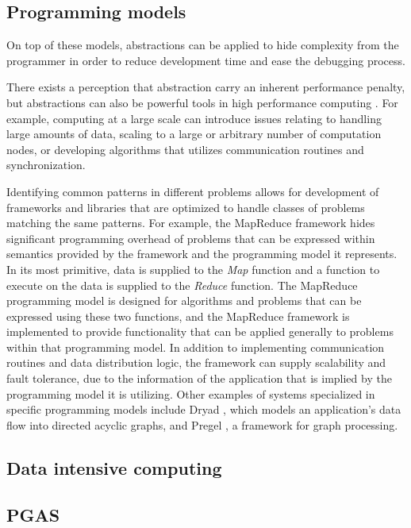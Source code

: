 \documentclass{uit-report}
\begin{document}
\subsection{Programming models}
On top of these models, abstractions can be applied to hide complexity from the programmer in order to reduce development time and ease the debugging process. 

There exists a perception that abstraction carry an inherent performance penalty, but abstractions can also be powerful tools in high performance computing \cite{mccandless_lumsdaine_1997}. For example, computing at a large scale can introduce issues relating to handling large amounts of data, scaling to a large or arbitrary number of computation nodes, or developing algorithms that utilizes communication routines and synchronization.

Identifying common patterns in different problems allows for development of frameworks and libraries that are optimized to handle classes of problems matching the same patterns. For example, the MapReduce framework hides significant programming overhead of problems that can be expressed within semantics provided by the framework and the programming model it represents. In its most primitive, data is supplied to the \emph{Map} function and a function to execute on the data is supplied to the \emph{Reduce} function. The MapReduce programming model is designed for algorithms and problems that can be expressed using these two functions, and the MapReduce framework is implemented to provide functionality that can be applied generally to problems within that programming model. In addition to implementing communication routines and data distribution logic, the framework can supply scalability and fault tolerance, due to the information of the application that is implied by the programming model it is utilizing. Other examples of systems specialized in specific programming models include Dryad \cite{dryad}, which models an application's data flow into directed acyclic graphs, and Pregel \cite{pregel}, a framework for graph processing.

\subsection{Data intensive computing}

\subsection{PGAS}
\cite{pgas_upc_energy}
\end{document}
